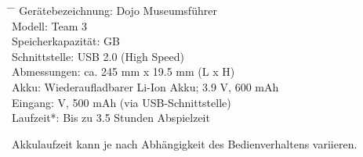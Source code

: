 \begin{tabbing}
\hspace{40mm}		\= \hspace{15mm} \=\kill
Gerätebezeichnung:	\> Dojo Museumsführer \\[4mm]
Modell:				\> Team 3 \\[4mm]
Speicherkapazität:	 GB \\[4mm]
Schnittstelle:		\> USB 2.0 (High Speed) \\[4mm]
Abmessungen:		\> ca. 245 mm x 19.5 mm (L x H) \\[4mm]
Akku:				\> Wiederaufladbarer Li-Ion Akku; 3.9 V, 600 mAh \\[4mm]
Eingang:			 V, 500 mAh (via USB-Schnittstelle) \\[4mm]
Laufzeit*:			\> Bis zu 3.5 Stunden Abspielzeit \\[4mm]
\end{tabbing}

\begin{description}
\item *Akkulaufzeit kann je nach Abhängigkeit des Bedienverhaltens variieren.
\end{description}